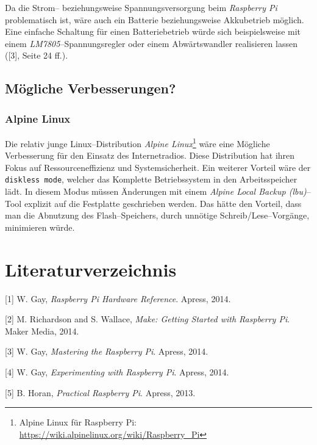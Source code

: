 \documentclass[11pt,ngerman,toc=listof,index=totoc]{scrreprt}
\begin{document}
Da die Strom-- beziehungsweise Spannungsversorgung beim \emph{Raspberry
Pi} problematisch ist, wäre auch ein Batterie beziehungsweise
Akkubetrieb möglich. Eine einfache Schaltung für einen Batteriebetrieb
würde sich beispielsweise mit einem \emph{LM7805}--Spannungsregler oder
einem Abwärtswandler realisieren lassen ({[}3{]}, Seite 24 ff.).

\section{Mögliche Verbesserungen?}\label{muxf6gliche-verbesserungen}

\subsection{Alpine Linux}\label{alpine-linux}

Die relativ junge Linux--Distribution \emph{Alpine Linux}\footnote{Alpine
  Linux für Raspberry Pi:
  \url{https://wiki.alpinelinux.org/wiki/Raspberry_Pi}} wäre eine
Mögliche Verbesserung für den Einsatz des Internetradios. Diese
Distribution hat ihren Fokus auf Ressourceneffizienz und
Systemsicherheit. Ein weiterer Vorteil wäre der \texttt{diskless\ mode},
welcher das Komplette Betriebssystem in den Arbeitsspeicher lädt. In
diesem Modus müssen Änderungen mit einem \emph{Alpine Local Backup
(lbu)}--Tool explizit auf die Festplatte geschrieben werden. Das hätte
den Vorteil, dass man die Abnutzung des Flash--Speichers, durch unnötige
Schreib/Lese--Vorgänge, minimieren würde.

\chapter*{Literaturverzeichnis}\label{literaturverzeichnis}

\hypertarget{refs}{}
\hypertarget{ref-gay2014raspberry}{}
{[}1{]} W. Gay, \emph{Raspberry Pi Hardware Reference}. Apress, 2014.

\hypertarget{ref-richardson2014make}{}
{[}2{]} M. Richardson and S. Wallace, \emph{Make: Getting Started with
Raspberry Pi}. Maker Media, 2014.

\hypertarget{ref-gay2014mastering}{}
{[}3{]} W. Gay, \emph{Mastering the Raspberry Pi}. Apress, 2014.

\hypertarget{ref-gay2014experimenting}{}
{[}4{]} W. Gay, \emph{Experimenting with Raspberry Pi}. Apress, 2014.

\hypertarget{ref-horan2013practical}{}
{[}5{]} B. Horan, \emph{Practical Raspberry Pi}. Apress, 2013.
\end{document}
